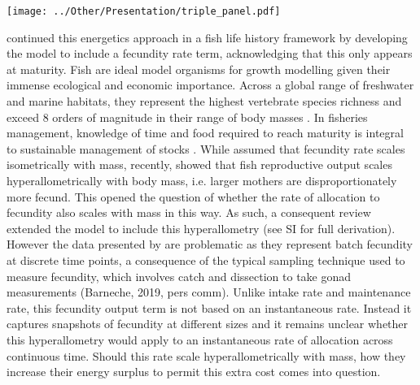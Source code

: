 \documentclass[a4paper]{article} %
\begin{document}
    \begin{center}
        \begin{minipage}{\linewidth}
        \texttt{[image: ../Other/Presentation/triple\_panel.pdf]}
        \label{growth_schedules}
        \end{minipage}%
    \end{center}

    \textcite{Charnov2001} continued this energetics approach in a fish life history framework by developing the \textcite{West2001} model to include a fecundity rate term, acknowledging that this only appears at maturity. Fish are ideal model organisms for growth modelling given their immense ecological and economic importance. Across a global range of freshwater and marine habitats, they represent the highest vertebrate species richness and exceed 8 orders of magnitude in their range of body masses \autocite{Barneche2018c}. In fisheries management, knowledge of time and food required to reach maturity is integral to sustainable management of stocks \autocite{Szuwalski2017, Barneche2018c}.
    While \textcite{Charnov2001} assumed that fecundity rate scales isometrically with mass, recently, \textcite{Barneche2018-reproductive_output} showed that fish reproductive output scales hyperallometrically with body mass, i.e. larger mothers are disproportionately more fecund. This opened the question of whether the rate of allocation to fecundity also scales with mass in this way. As such, a consequent review extended the \textcite{Charnov2001} model to include this hyperallometry \autocite{Marshall2019b} (see SI for full derivation). However the data presented by \textcite{Barneche2018-reproductive_output} are problematic as they represent batch fecundity at discrete time points, a consequence of the typical sampling technique used to measure fecundity, which involves catch and dissection to take gonad measurements (Barneche, 2019, pers comm). Unlike intake rate and maintenance rate, this fecundity output term is not based on an instantaneous rate. Instead it captures snapshots of fecundity at different sizes and it remains unclear whether this hyperallometry would apply to an instantaneous rate of allocation across continuous time. Should this rate scale hyperallometrically with mass, how they increase their energy surplus to permit this extra cost comes into question.
\end{document}
